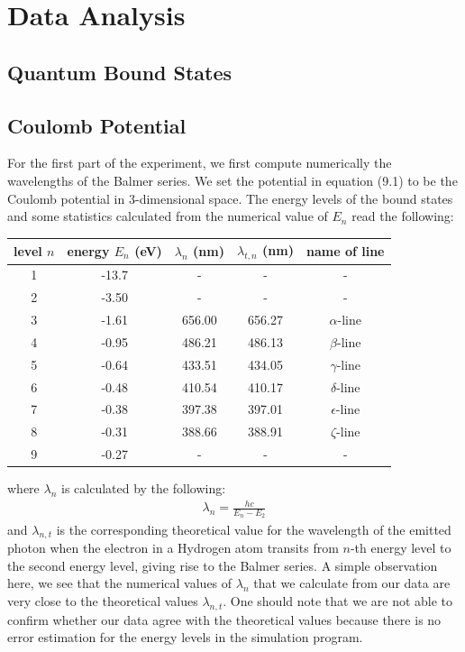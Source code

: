 \documentclass[11pt]{book}
\theoremstyle{break}
\theoremstyle{break}
\begin{document}
\newpage
\section{Data Analysis}
\subsection*{Quantum Bound States}
\subsection{Coulomb Potential}
For the first part of the experiment, we first compute numerically the wavelengths of the Balmer series. We set the potential in equation (9.1) to be the Coulomb potential in $3$-dimensional space. The energy levels of the bound states and some statistics calculated from the numerical value of $E_n$ read the following:
\begin{center}
\begin{tabular}{|c|c|c|c|c|}
\hline
level $n$ & energy $E_n$ (eV) & $\lambda_n$ (nm)& $\lambda_{t,n}$ (nm) & name of line\\
\hline
1 & -13.7 & - & - & - \\
\hline
2 & -3.50 &- &- &-\\
\hline
3 & -1.61 & 656.00 & 656.27 & $\alpha$-line \\
\hline
4 & -0.95 & 486.21 & 486.13 & $\beta$-line \\
\hline
5 & -0.64 & 433.51 & 434.05 & $\gamma$-line  \\
\hline
6 & -0.48 & 410.54 & 410.17 & $\delta$-line \\
\hline
7 & -0.38  & 397.38 & 397.01 & $\epsilon$-line \\
\hline
8 & -0.31  & 388.66 & 388.91 & $\zeta$-line \\
\hline
9 & -0.27  & - & - &- \\
\hline
\end{tabular}
\end{center}
where $\lambda_n$ is calculated by the following:
\begin{align*}
\lambda_n = \frac{hc}{E_n-E_2}
\end{align*}
and $\lambda_{n,t}$ is the corresponding theoretical value for the wavelength of the emitted photon when the electron in a Hydrogen atom transits from $n$-th energy level to the second energy level, giving rise to the Balmer series. A simple observation here, we see that the numerical values of $\lambda_n$ that we calculate from our data are very close to the theoretical values $\lambda_{n,t}$. One should note that we are not able to confirm whether our data agree with the theoretical values because there is no error estimation for the energy levels in the simulation program. \\
\end{document}
